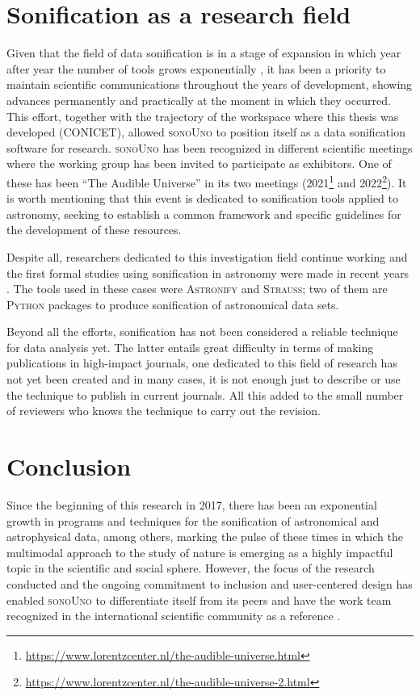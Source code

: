 \documentclass[baaa]{baaa}
\begin{document}
\section{Sonification as a research field}

Given that the field of data sonification is in a stage of expansion in which year after year the number of tools grows exponentially \citep{zanella2022}, it has been a priority to maintain scientific communications throughout the years of development, showing advances permanently and practically at the moment in which they occurred. This effort, together with the trajectory of the workspace where this thesis was developed (CONICET), allowed \textsc{sonoUno} to position itself as a data sonification software for research. \textsc{sonoUno} has been recognized in different scientific meetings where the working group has been invited to participate as exhibitors. One of these has been ``The Audible Universe'' in its two meetings ({2021}\footnote[5]{\url{https://www.lorentzcenter.nl/the-audible-universe.html}} and {2022}\footnote[6]{\url{https://www.lorentzcenter.nl/the-audible-universe-2.html}}). It is worth mentioning that this event is dedicated to sonification tools applied to astronomy, seeking to establish a common framework and specific guidelines for the development of these resources.

Despite all, researchers dedicated to this investigation field continue working and the first formal studies using sonification in astronomy were made in recent years \citep{MNRAStucker2022, trayford2023}. The tools used in these cases were \textsc{Astronify} and \textsc{Strauss}; two of them are \textsc{Python} packages to produce sonification of astronomical data sets.

Beyond all the efforts, sonification has not been considered a reliable technique for data analysis yet. The latter entails great difficulty in terms of making publications in high-impact journals, one dedicated to this field of research has not yet been created and in many cases, it is not enough just to describe or use the technique to publish in current journals. All this added to the small number of reviewers who knows the technique to carry out the revision.

\section{Conclusion}
\label{sec:conclusion}

Since the beginning of this research in 2017, there has been an exponential growth in programs and techniques for the sonification of astronomical and astrophysical data, among others, marking the pulse of these times in which the multimodal approach to the study of nature is emerging as a highly impactful topic in the scientific and social sphere. However, the focus of the research conducted and the ongoing commitment to inclusion and user-centered design has enabled \textsc{sonoUno} to differentiate itself from its peers and have the work team recognized in the international scientific community as a reference \citep{zanella2022}.
\end{document}
